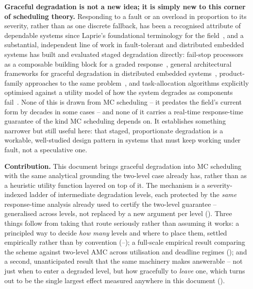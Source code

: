\documentclass{article}
\begin{document}
\textbf{Graceful degradation is not a new idea; it is simply new to this corner of scheduling
theory.} Responding to a fault or an overload in proportion to its severity, rather than as one
discrete fallback, has been a recognised attribute of dependable systems since Laprie's
foundational terminology for the field~\cite{Laprie_dependability_definition}, and a substantial,
independent line of work in fault-tolerant and distributed embedded systems has built and
evaluated staged degradation directly: fail-stop processors as a composable building block for a
graded response~\cite{schlichting83failstop}, general architectural frameworks for graceful
degradation in distributed embedded systems~\cite{shelton}, product-family approaches to the same
problem~\cite{nace}, and task-allocation algorithms explicitly optimised against a utility model
of how the system degrades as components fail~\cite{rtss_2008}. None of this is drawn from MC
scheduling -- it predates the field's current form by decades in some cases -- and none of it
carries a real-time response-time guarantee of the kind MC scheduling depends on. It establishes
something narrower but still useful here: that staged, proportionate degradation is a workable,
well-studied design pattern in systems that must keep working under fault, not a speculative one.

\textbf{Contribution.} This document brings graceful degradation into MC scheduling with the same
analytical grounding the two-level case already has, rather than as a heuristic utility function
layered on top of it. The mechanism is a severity-indexed ladder of intermediate degradation
levels, each protected by the \emph{same} response-time analysis already used to certify the
two-level guarantee -- generalised across levels, not replaced by a new argument per level
(). Three things follow from taking that route
seriously rather than assuming it works: a principled way to decide \emph{how many} levels and
where to place them, settled empirically rather than by convention
(--); a full-scale empirical result
comparing the scheme against two-level AMC across utilisation and deadline regimes
(); and a second, unanticipated result that the same machinery makes
answerable -- not just when to enter a degraded level, but how gracefully to \emph{leave} one,
which turns out to be the single largest effect measured anywhere in this document
().
\end{document}
